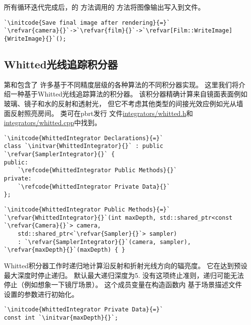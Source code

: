 所有循环迭代完成后，的
方法调用的
方法将图像输出写入到文件。
\begin{lstlisting}
`\initcode{Save final image after rendering}{=}`
`\refvar{camera}{}`->`\refvar{film}{}`->`\refvar[Film::WriteImage]{WriteImage}{}`();
\end{lstlisting}

\subsection{Whitted光线追踪积分器}\label{sub:Whitted光线追踪积分器}
第和包含了
许多基于不同精度层级的各种算法的不同积分器实现。
这里我们将介绍一种基于Whitted光线追踪算法的积分器。
该积分器精确计算来自镜面表面例如玻璃、镜子和水的反射和透射光，
但它不考虑其他类型的间接光效应例如光从墙面反射照亮房间。
类可在pbrt发行
文件\href{https://github.com/mmp/pbrt-v3/tree/master/src/integrators/whitted.h}{\ttfamily integrators/whitted.h}和
\href{https://github.com/mmp/pbrt-v3/tree/master/src/integrators/whitted.cpp}{\ttfamily integrators/whitted.cpp}中找到。
\begin{lstlisting}
`\initcode{WhittedIntegrator Declarations}{=}`
class `\initvar{WhittedIntegrator}{}` : public `\refvar{SamplerIntegrator}{}` {
public:
    `\refcode{WhittedIntegrator Public Methods}{}`
private:
    `\refcode{WhittedIntegrator Private Data}{}`
};
\end{lstlisting}
\begin{lstlisting}
`\initcode{WhittedIntegrator Public Methods}{=}`
`\refvar{WhittedIntegrator}{}`(int maxDepth, std::shared_ptr<const `\refvar{Camera}{}`> camera,
    std::shared_ptr<`\refvar{Sampler}{}`> sampler)
    : `\refvar{SamplerIntegrator}{}`(camera, sampler), `\refvar{maxDepth}{}`(maxDepth) { }
\end{lstlisting}

Whitted积分器工作时递归地计算沿反射和折射光线方向的辐亮度。
它在达到预设最大深度时停止递归。
默认最大递归深度为5.
没有这项终止准则，递归可能无法停止（例如想象一下镜厅场景）。
这个成员变量在构造函数内
基于场景描述文件设置的参数进行初始化。
\begin{lstlisting}
`\initcode{WhittedIntegrator Private Data}{=}`
const int `\initvar{maxDepth}{}`;
\end{lstlisting}

